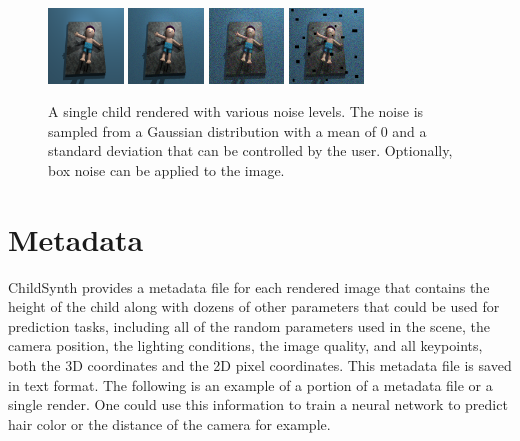 \documentclass{article}
\begin{document}
\begin{figure}[htbp]
    \centering
    \includegraphics[height=2.0cm]{plots/noise0.png}
    \includegraphics[height=2.0cm]{plots/noise1.png}
    \includegraphics[height=2.0cm]{plots/noise2.png}
    \includegraphics[height=2.0cm]{plots/noise4.png}

    \caption{A single child rendered with various noise levels. The noise is sampled from a Gaussian distribution with a mean of $0$ and a standard deviation that can be controlled by the user. Optionally, box noise can be applied to the image.}
    \label{fig:noise}
\end{figure}

\section{Metadata}

ChildSynth provides a metadata file for each rendered image that contains the height of the child along with dozens of other parameters that could be used for prediction tasks, including all of the random parameters used in the scene, the camera position, the lighting conditions, the image quality, and all keypoints, both the 3D coordinates and the 2D pixel coordinates. This metadata file is saved in text format. The following is an example of a portion of a metadata file or a single render. One could use this information to train a neural network to predict hair color or the distance of the camera for example.
\end{document}
